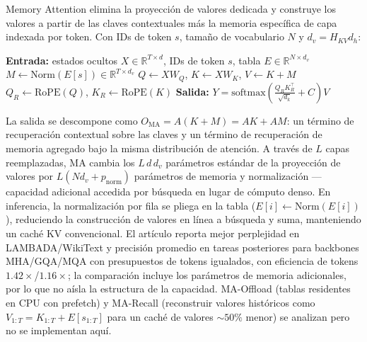 Memory Attention \citep{kang_memory_attention_2026} elimina la proyección de
valores dedicada y construye los valores a partir de las claves contextuales más
la memoria específica de capa indexada por token. Con IDs de token $s$, tamaño de
vocabulario $N$ y $d_v = H_{KV} d_h$:

\begin{algorithmic}[1]
\State \textbf{Entrada:} estados ocultos $X \in \mathbb{R}^{T \times d}$, IDs de token $s$, tabla $E \in \mathbb{R}^{N \times d_v}$
\State $M \gets \mathrm{Norm}(E[s]) \in \mathbb{R}^{T \times d_v}$ 
\State $Q \gets X W_Q$, \quad $K \gets X W_K$, \quad $V \gets K + M$ 
\State $Q_R \gets \mathrm{RoPE}(Q)$, \quad $K_R \gets \mathrm{RoPE}(K)$ 
\State \textbf{Salida:} $Y = \mathrm{softmax}\!\left(\tfrac{Q_R K_R^\top}{\sqrt{d_k}} + C\right) V$
\end{algorithmic}

La salida se descompone como $O_{\mathrm{MA}} = A(K{+}M) = AK + AM$: un término de
recuperación contextual sobre las claves y un término de recuperación de memoria
agregado bajo la misma distribución de atención. A través de $L$ capas
reemplazadas, MA cambia los $L\,d\,d_v$ parámetros estándar de la proyección de
valores por $L(N d_v + p_{\mathrm{norm}})$ parámetros de memoria y normalización
---capacidad adicional accedida por búsqueda en lugar de cómputo denso. En
inferencia, la normalización por fila se pliega en la tabla ($E[i] \gets
\mathrm{Norm}(E[i])$), reduciendo la construcción de valores en línea a búsqueda
y suma, manteniendo un caché KV convencional. El artículo reporta mejor perplejidad
en LAMBADA/WikiText y precisión promedio en tareas posteriores para backbones
MHA/GQA/MQA con presupuestos de tokens igualados, con eficiencia de tokens
$1.42\times$/$1.16\times$; la comparación incluye los parámetros de memoria
adicionales, por lo que no aísla la estructura de la capacidad. MA-Offload
(tablas residentes en CPU con prefetch) y MA-Recall (reconstruir valores
históricos como $V_{1:T} = K_{1:T} + E[s_{1:T}]$ para un caché de valores
${\sim}50\%$ menor) se analizan pero no se implementan aquí.

